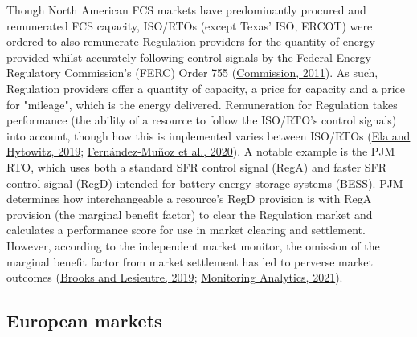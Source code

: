 \documentclass[12pt,a4paper,]{report}
\begin{document}
Though North American FCS markets have predominantly procured and
remunerated FCS capacity, ISO/RTOs (except Texas' ISO, ERCOT) were
ordered to also remunerate Regulation providers for the quantity of
energy provided whilst accurately following control signals by the
Federal Energy Regulatory Commission's (FERC) Order 755
(\protect\hyperlink{ref-federalenergyregulatorycommissionfercOrderNo7552011}{Commission,
2011}). As such, Regulation providers offer a quantity of capacity, a
price for capacity and a price for "mileage", which is the energy
delivered. Remuneration for Regulation takes performance (the ability of
a resource to follow the ISO/RTO's control signals) into account, though
how this is implemented varies between ISO/RTOs
(\protect\hyperlink{ref-elaAncillaryServicesUnited2019}{Ela and
Hytowitz, 2019};
\protect\hyperlink{ref-fernandez-munozFastFrequencyControl2020}{Fernández-Muñoz
et al., 2020}). A notable example is the PJM RTO, which uses both a
standard SFR control signal (RegA) and faster SFR control signal (RegD)
intended for battery energy storage systems (BESS). PJM determines how
interchangeable a resource's RegD provision is with RegA provision (the
marginal benefit factor) to clear the Regulation market and calculates a
performance score for use in market clearing and settlement. However,
according to the independent market monitor, the omission of the
marginal benefit factor from market settlement has led to perverse
market outcomes
(\protect\hyperlink{ref-brooksReviewFrequencyRegulation2019}{Brooks and
Lesieutre, 2019};
\protect\hyperlink{ref-monitoringanalytics2021QuarterlyState2021}{Monitoring
Analytics, 2021}).

\hypertarget{sec:fcs-EU}{%
\subsection{European markets}\label{sec:fcs-EU}}
\end{document}
